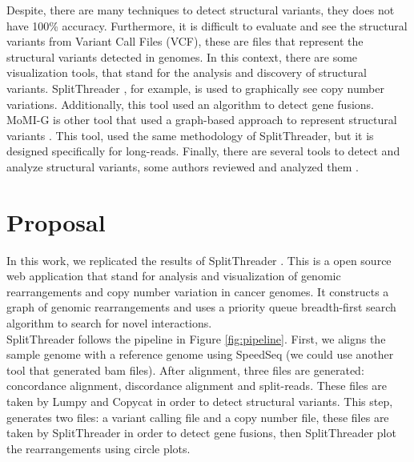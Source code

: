 \documentclass{svproc}
\begin{document}
Despite, there are many techniques to detect structural variants, they does not have 100\% accuracy. Furthermore, it is difficult to evaluate and see the structural variants from Variant Call Files (VCF), these are files that represent the structural variants detected in genomes. In this context, there are some visualization tools, that stand for the analysis and discovery of structural variants. SplitThreader \cite{nattestad2016splitthreader}, for example, is used to graphically see copy number variations. Additionally, this tool used an algorithm to detect gene fusions.\\

MoMI-G is other tool that used a graph-based approach to represent structural variants \cite{yokoyama2019momi}. This tool, used the same methodology of SplitThreader, but it is designed specifically for long-reads. Finally, there are several tools to detect and analyze structural variants,  some authors reviewed and analyzed them \cite{yokoyama2020visualization}.

\section{Proposal} 

In this work, we replicated the results of SplitThreader \cite{nattestad2016splitthreader}. This is a open source web application that stand for  analysis and visualization of genomic rearrangements and copy number variation in cancer genomes. It constructs a graph of genomic rearrangements and uses a priority queue breadth-first search algorithm to search for novel interactions.\\

SplitThreader follows the pipeline in Figure \ref{fig:pipeline}. First, we aligns the sample genome with a reference genome using SpeedSeq (we could use another tool that generated bam files). After alignment, three files are generated: concordance alignment, discordance alignment and split-reads. These files are taken by Lumpy and Copycat in order to detect structural variants. This step, generates two files: a variant calling file and a copy number file, these files are taken by SplitThreader in order to detect gene fusions, then SplitThreader plot the rearrangements using circle plots. 
\end{document}
